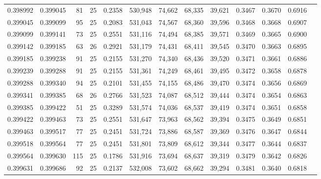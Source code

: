 \begin{tabular}{rrrrrrrrrrrrr}
0.398992 & 0.399045 &    81 &  25 &                                     0.2358 & 530,948 &  74,662 &  68,335 &  39,621 & 0.3467 & 0.3670 & 0.6916 \\
0.399045 & 0.399099 &    95 &  25 &                                     0.2083 & 531,043 &  74,567 &  68,360 &  39,596 & 0.3468 & 0.3668 & 0.6907 \\
0.399099 & 0.399141 &    73 &  25 &                                     0.2551 & 531,116 &  74,494 &  68,385 &  39,571 & 0.3469 & 0.3665 & 0.6900 \\
0.399142 & 0.399185 &    63 &  26 &                                     0.2921 & 531,179 &  74,431 &  68,411 &  39,545 & 0.3470 & 0.3663 & 0.6895 \\
0.399185 & 0.399238 &    91 &  25 &                                     0.2155 & 531,270 &  74,340 &  68,436 &  39,520 & 0.3471 & 0.3661 & 0.6886 \\
0.399239 & 0.399288 &    91 &  25 &                                     0.2155 & 531,361 &  74,249 &  68,461 &  39,495 & 0.3472 & 0.3658 & 0.6878 \\
0.399288 & 0.399340 &    94 &  25 &                                     0.2101 & 531,455 &  74,155 &  68,486 &  39,470 & 0.3474 & 0.3656 & 0.6869 \\
0.399341 & 0.399385 &    68 &  26 &                                     0.2766 & 531,523 &  74,087 &  68,512 &  39,444 & 0.3474 & 0.3654 & 0.6863 \\
0.399385 & 0.399422 &    51 &  25 &                                     0.3289 & 531,574 &  74,036 &  68,537 &  39,419 & 0.3474 & 0.3651 & 0.6858 \\
0.399422 & 0.399463 &    73 &  25 &                                     0.2551 & 531,647 &  73,963 &  68,562 &  39,394 & 0.3475 & 0.3649 & 0.6851 \\
0.399463 & 0.399517 &    77 &  25 &                                     0.2451 & 531,724 &  73,886 &  68,587 &  39,369 & 0.3476 & 0.3647 & 0.6844 \\
0.399518 & 0.399564 &    77 &  25 &                                     0.2451 & 531,801 &  73,809 &  68,612 &  39,344 & 0.3477 & 0.3644 & 0.6837 \\
0.399564 & 0.399630 &   115 &  25 &                                     0.1786 & 531,916 &  73,694 &  68,637 &  39,319 & 0.3479 & 0.3642 & 0.6826 \\
0.399631 & 0.399686 &    92 &  25 &                                     0.2137 & 532,008 &  73,602 &  68,662 &  39,294 & 0.3481 & 0.3640 & 0.6818 \\

\end{tabular}
